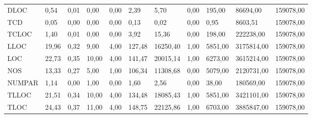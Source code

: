 \begin{table}[H]
{\begin{tabular}{@{}lp{10mm}p{10mm}p{10mm}p{10mm}llllll@{}}
DLOC                                & 0,54           & 0,01                    & 0,00             & 0,00          & 2,39                           & 5,70                              & 0,00            & 195,00          & 86694,00       & 159078,00       \\
TCD                                 & 0,05           & 0,00                    & 0,00             & 0,00          & 0,13                           & 0,02                              & 0,00            & 0,95            & 8603,51        & 159078,00       \\
TCLOC                               & 1,40           & 0,01                    & 0,00             & 0,00          & 3,92                           & 15,36                             & 0,00            & 198,00          & 222238,00      & 159078,00       \\
LLOC                                & 19,96          & 0,32                    & 9,00             & 4,00          & 127,48                         & 16250,40                          & 1,00            & 5851,00         & 3175814,00     & 159078,00       \\
LOC                                 & 22,73          & 0,35                    & 10,00            & 4,00          & 141,47                         & 20015,14                          & 1,00            & 6273,00         & 3615214,00     & 159078,00       \\
NOS                                 & 13,33          & 0,27                    & 5,00             & 1,00          & 106,34                         & 11308,68                          & 0,00            & 5079,00         & 2120731,00     & 159078,00       \\
NUMPAR                              & 1,14           & 0,00                    & 1,00             & 0,00          & 1,60                           & 2,56                              & 0,00            & 38,00           & 180569,00      & 159078,00       \\
TLLOC                               & 21,51          & 0,34                    & 10,00            & 4,00          & 134,48                         & 18085,43                          & 1,00            & 5851,00         & 3421101,00     & 159078,00       \\
TLOC                                & 24,43          & 0,37                    & 11,00            & 4,00          & 148,75                         & 22125,86                          & 1,00            & 6703,00         & 3885847,00     & 159078,00       \\

\end{tabular}}
\end{table}
